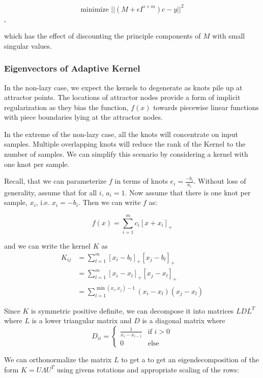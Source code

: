 \begin{equation}
    \text{minimize } ||(M + \epsilon I^{s \times m})c - y||^2
\end{equation},

which has the effect of discounting the principle components of $M$ with small singular values.

\subsubsection{Eigenvectors of Adaptive Kernel}
In the non-lazy case, we expect the kernels to degenerate as knots pile up at attractor points. The locations of attractor nodes provide a form of implicit regularization as they bias the function, $f(x)$ towards piecewise linear functions with piece boundaries lying at the attractor nodes.

In the extreme of the non-lazy case, all the knots will concentrate on input samples. Multiple overlapping knots will reduce the rank of the Kernel to the number of samples. We can simplify this scenario by considering a kernel with one knot per sample.

Recall, that we can parameterize $f$ in terms of knots $e_i = \frac{-b_i}{a_i}$. Without loss of generality, assume that for all $i$, $a_i = 1$. Now assume that there is one knot per sample, $x_i$, i.e. $x_i = -b_i$. Then we can write $f$ as:

\begin{equation}
    f(x) = \sum_{i=1}^m c_i [x + x_i]_+
\end{equation}

and we can write the kernel $K$ as
\begin{align}
    K_{ij} &= \sum_{l=1}^m [x_i - b_l]_+ [x_j - b_l]_+\\
           &= \sum_{l=1}^m [x_i - x_l]_+ [x_j - x_l]_+\\
           &= \sum_{l = 1}^{\min(x_i, x_j)-1} (x_i - x_l) (x_j - x_l)
\end{align}

Since $K$ is symmetric positive definite, we can decompose it into matrices $LDL^T$ where $L$ is a lower triangular matrix and $D$ is a diagonal matrix where 
\begin{equation*}
    D_{ii} = \begin{cases}\frac{1}{x_i - x_{i-1}}& \text{if } i > 0\\0 & \text{else}\end{cases}
\end{equation*}

We can orthonormalize the matrix $L$ to get a to get an eigendecomposition of the form $K = U \Lambda U^T$ using givens rotations and appropriate scaling of the rows:

